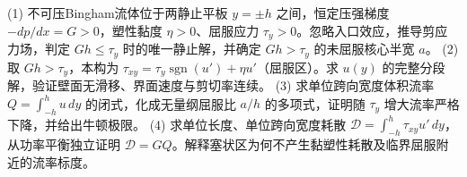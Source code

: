 (1) 不可压Bingham流体位于两静止平板 \(y=\pm h\) 之间，恒定压强梯度 \(-dp/dx=G>0\)，塑性黏度 \(\eta>0\)、屈服应力 \(\tau_y>0\)。忽略入口效应，推导剪应力场，判定 \(Gh\leq\tau_y\) 时的唯一静止解，并确定 \(Gh>\tau_y\) 的未屈服核心半宽 \(a\)。
(2) 取 \(Gh>\tau_y\)，本构为 \(\tau_{xy}=\tau_y\operatorname{sgn}(u')+\eta u'\)（屈服区）。求 \(u(y)\) 的完整分段解，验证壁面无滑移、界面速度与剪切率连续。
(3) 求单位跨向宽度体积流率 \(Q=\int_{-h}^h u\,dy\) 的闭式，化成无量纲屈服比 \(a/h\) 的多项式，证明随 \(\tau_y\) 增大流率严格下降，并给出牛顿极限。
(4) 求单位长度、单位跨向宽度耗散 \(\mathcal D=\int_{-h}^h\tau_{xy}u'\,dy\)，从功率平衡独立证明 \(\mathcal D=GQ\)。解释塞状区为何不产生黏塑性耗散及临界屈服附近的流率标度。
